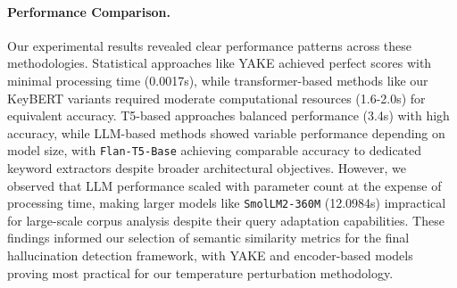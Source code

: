 \documentclass[sigconf]{acmart}
\begin{document}
\paragraph{Performance Comparison.}
Our experimental results revealed clear performance patterns across these methodologies. Statistical approaches like YAKE achieved perfect scores with minimal processing time (0.0017s), while transformer-based methods like our KeyBERT variants required moderate computational resources (1.6-2.0s) for equivalent accuracy. T5-based approaches balanced performance (3.4s) with high accuracy, while LLM-based methods showed variable performance depending on model size, with \texttt{Flan-T5-Base} achieving comparable accuracy to dedicated keyword extractors despite broader architectural objectives. However, we observed that LLM performance scaled with parameter count at the expense of processing time, making larger models like \texttt{SmolLM2-360M} (12.0984s) impractical for large-scale corpus analysis despite their query adaptation capabilities. These findings informed our selection of semantic similarity metrics for the final hallucination detection framework, with YAKE and encoder-based models proving most practical for our temperature perturbation methodology.
\end{document}
